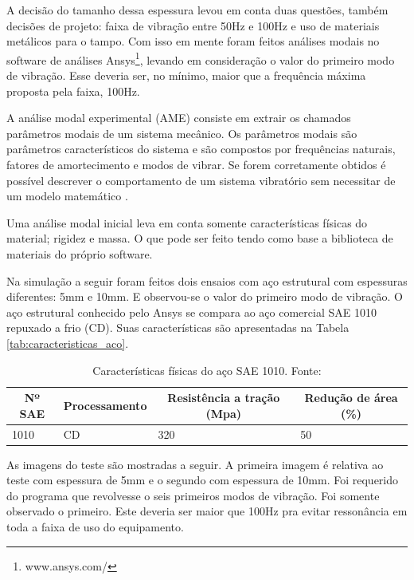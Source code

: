 	A decisão do tamanho dessa espessura levou em conta duas questões, também decisões de projeto: faixa de vibração entre 50Hz e 100Hz e uso de materiais metálicos para o tampo. Com isso em mente foram feitos análises modais no software de análises Ansys\footnote{www.ansys.com/}, levando em consideração o valor do primeiro modo de vibração. Esse deveria ser, no mínimo, maior que a frequência máxima proposta pela faixa, 100Hz.
    
	A análise modal experimental (AME) consiste em extrair os chamados parâmetros modais de um sistema mecânico. Os parâmetros modais são parâmetros característicos do sistema e são compostos por frequências naturais, fatores de amortecimento e modos de vibrar. Se forem corretamente obtidos é possível descrever o comportamento de um sistema vibratório sem necessitar de um modelo matemático \cite{humberto}.
    
	Uma análise modal inicial leva em conta somente características físicas do material; rigidez e massa. O que pode ser feito tendo como base a biblioteca de materiais do próprio software. 
    
	Na simulação a seguir foram feitos dois ensaios com aço estrutural com espessuras diferentes: 5mm e 10mm. E observou-se o valor do primeiro modo de vibração. O aço estrutural conhecido pelo Ansys se compara ao aço comercial SAE 1010 repuxado a frio (CD). Suas características são apresentadas na Tabela \ref{tab:caracteristicas_aco}.

\begin{table}[!h]
\centering
\caption{Características físicas do aço SAE 1010. Fonte: \cite{shigley}}
\label{my-label}
\begin{tabular}{|l|l|l|l|}
\hline
\multicolumn{1}{|c|}{\textbf{Nº SAE}} & \multicolumn{1}{c|}{\textbf{Processamento}} & \multicolumn{1}{c|}{\textbf{Resistência a tração (Mpa)}} & \multicolumn{1}{c|}{\textbf{Redução de área (\%)}} \\ \hline
1010                                  & CD                                          & 320                                                      & 50                                                 \\ \hline
\end{tabular}
\end{table}


As imagens do teste são mostradas a seguir. A primeira imagem é relativa ao teste com espessura de 5mm e o segundo com espessura de 10mm. Foi requerido do programa que revolvesse o seis primeiros modos de vibração. Foi somente observado o primeiro. Este deveria ser maior que 100Hz pra evitar ressonância em toda a faixa de uso do equipamento.

\pagebreak